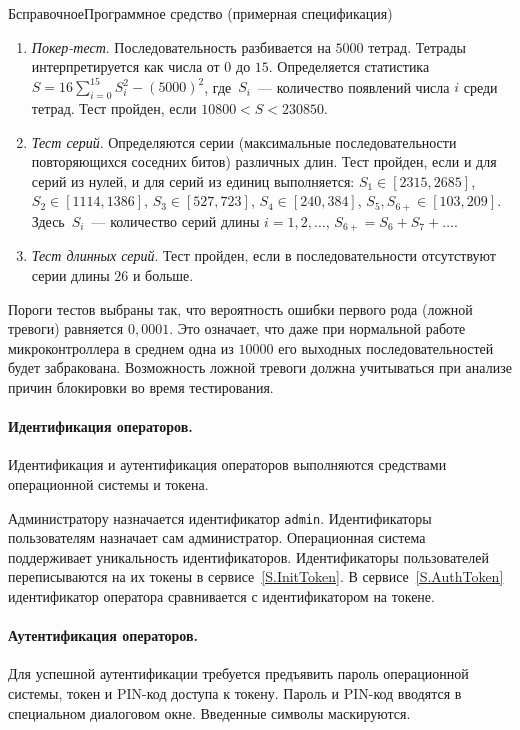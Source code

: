 \begin{appendix}{Б}{справочное}{Программное средство \CryptoDisk 
(примерная спецификация)}
\begin{enumerate}
\item
{\it Покер-тест}.
Последовательность разбивается на $5000$ тетрад.
Тетрады интерпретируется как числа от $0$ до $15$.
Определяется статистика~$S=16\sum_{i=0}^{15}S_i^2-(5000)^2$,
где~$S_i$~--- количество появлений числа $i$ среди тетрад.
Тест пройден, если $10800<S<230850$.

\item
{\it Тест серий}.
Определяются серии (максимальные последовательности повторяющихся соседних 
битов) различных длин. 
Тест пройден, если и для серий из нулей, и для серий из единиц выполняется: 
$S_1\in[2315,2685]$,
$S_2\in[1114,1386]$,
$S_3\in[527,723]$,
$S_4\in[240,384]$,
$S_5,S_{6+}\in[103,209]$.
Здесь~$S_i$~--- количество серий длины $i=1,2,\ldots$, 
$S_{6+}=S_6+S_7+\ldots$.

\item
{\it Тест длинных серий}.
Тест пройден, если в последовательности отсутствуют серии длины $26$ и больше.
\end{enumerate}

Пороги тестов выбраны так, что вероятность ошибки первого рода (ложной тревоги)
равняется $0,0001$.
Это означает, что даже при нормальной работе микроконтроллера 
в среднем одна из $10000$ его выходных последовательностей
будет забракована.
%
Возможность ложной тревоги должна учитываться при анализе причин блокировки
\CryptoDisk во время тестирования.


\paragraph*{Идентификация операторов.}
Идентификация и аутентификация операторов выполняются 
средствами операционной системы и токена.

Администратору назначается идентификатор \texttt{admin}.
Идентификаторы пользователям назначает сам администратор.
Операционная система поддерживает уникальность идентификаторов.
%
Идентификаторы пользователей переписываются на их токены в сервисе~\ref{S.InitToken}.
В сервисе~\ref{S.AuthToken} идентификатор оператора сравнивается 
с идентификатором на токене.

\paragraph*{Аутентификация операторов.}
Для успешной аутентификации требуется предъявить пароль операционной системы,
токен и PIN-код доступа к токену.
%
Пароль и PIN-код вводятся в специальном диалоговом окне. 
Введенные символы маскируются.


\end{appendix}
